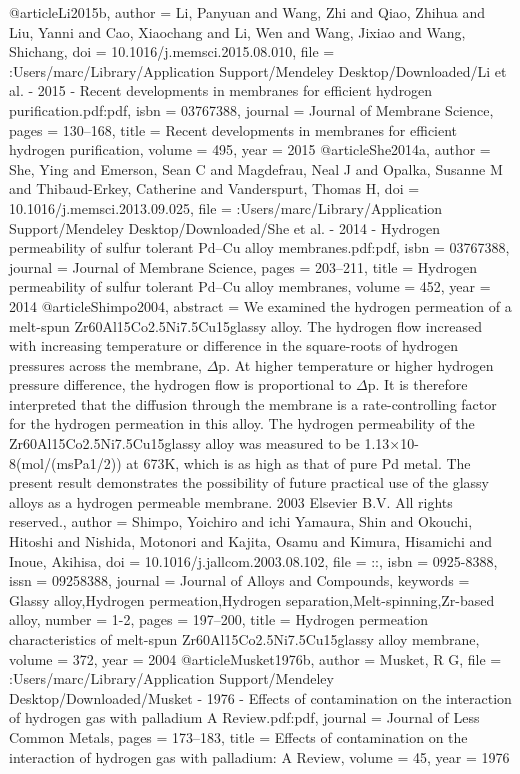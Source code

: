 @article{Li2015b,
author = {Li, Panyuan and Wang, Zhi and Qiao, Zhihua and Liu, Yanni and Cao, Xiaochang and Li, Wen and Wang, Jixiao and Wang, Shichang},
doi = {10.1016/j.memsci.2015.08.010},
file = {:Users/marc/Library/Application Support/Mendeley Desktop/Downloaded/Li et al. - 2015 - Recent developments in membranes for efficient hydrogen purification.pdf:pdf},
isbn = {03767388},
journal = {Journal of Membrane Science},
pages = {130--168},
title = {{Recent developments in membranes for efficient hydrogen purification}},
volume = {495},
year = {2015}
}
@article{She2014a,
author = {She, Ying and Emerson, Sean C and Magdefrau, Neal J and Opalka, Susanne M and Thibaud-Erkey, Catherine and Vanderspurt, Thomas H},
doi = {10.1016/j.memsci.2013.09.025},
file = {:Users/marc/Library/Application Support/Mendeley Desktop/Downloaded/She et al. - 2014 - Hydrogen permeability of sulfur tolerant Pd–Cu alloy membranes.pdf:pdf},
isbn = {03767388},
journal = {Journal of Membrane Science},
pages = {203--211},
title = {{Hydrogen permeability of sulfur tolerant Pd–Cu alloy membranes}},
volume = {452},
year = {2014}
}
@article{Shimpo2004,
abstract = {We examined the hydrogen permeation of a melt-spun Zr60Al15Co2.5Ni7.5Cu15glassy alloy. The hydrogen flow increased with increasing temperature or difference in the square-roots of hydrogen pressures across the membrane, $\Delta$p. At higher temperature or higher hydrogen pressure difference, the hydrogen flow is proportional to $\Delta$p. It is therefore interpreted that the diffusion through the membrane is a rate-controlling factor for the hydrogen permeation in this alloy. The hydrogen permeability of the Zr60Al15Co2.5Ni7.5Cu15glassy alloy was measured to be 1.13×10-8(mol/(msPa1/2)) at 673K, which is as high as that of pure Pd metal. The present result demonstrates the possibility of future practical use of the glassy alloys as a hydrogen permeable membrane. {\textcopyright} 2003 Elsevier B.V. All rights reserved.},
author = {Shimpo, Yoichiro and ichi Yamaura, Shin and Okouchi, Hitoshi and Nishida, Motonori and Kajita, Osamu and Kimura, Hisamichi and Inoue, Akihisa},
doi = {10.1016/j.jallcom.2003.08.102},
file = {::},
isbn = {0925-8388},
issn = {09258388},
journal = {Journal of Alloys and Compounds},
keywords = {Glassy alloy,Hydrogen permeation,Hydrogen separation,Melt-spinning,Zr-based alloy},
number = {1-2},
pages = {197--200},
title = {{Hydrogen permeation characteristics of melt-spun Zr60Al15Co2.5Ni7.5Cu15glassy alloy membrane}},
volume = {372},
year = {2004}
}
@article{Musket1976b,
author = {Musket, R G},
file = {:Users/marc/Library/Application Support/Mendeley Desktop/Downloaded/Musket - 1976 - Effects of contamination on the interaction of hydrogen gas with palladium A Review.pdf:pdf},
journal = {Journal of Less Common Metals},
pages = {173--183},
title = {{Effects of contamination on the interaction of hydrogen gas with palladium: A Review}},
volume = {45},
year = {1976}
}
